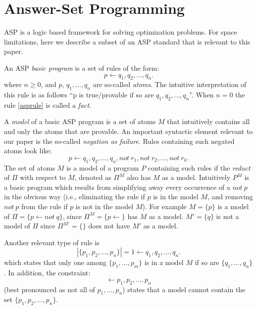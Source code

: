 \section{Answer-Set Programming}
ASP \cite{paper-de-lifschitz-what-is-ASP} is a logic based framework for solving optimization problems. For space limitations, here we describe a subset of an ASP standard that is relevant to this paper. 

An ASP \emph{basic program} is a set of rules of the form:
\begin{equation}\label{asprule}
p\leftarrow q_1,q_2,\ldots,q_n.
\end{equation}
where $n\geq 0$, and $p$, $q_1,\ldots,q_n$ are so-called \emph{atoms}. The intuitive interpretation of this rule is as follows ``p is true/provable if so are $q_1,q_2,\ldots,q_n$''. When $n=0$ the rule \eqref{asprule} is called a \emph{fact}.

A \emph{model} of a basic ASP program is a set of atoms $M$ that intuitively contains all and only the atoms that are provable. An important syntactic element relevant to our paper is the so-called \emph{negation as failure}. Rules containing such negated atoms look like:
\begin{equation}\label{asprule}
p\leftarrow q_1,q_2,\ldots,q_n, not\: r_1,not\: r_2, \ldots, not\: r_k .
\end{equation}
The set of atoms $M$ is a model of a program $P$ containing such rules if the \emph{reduct} of $\Pi$ with respect to $M$, denoted as $\Pi^M$ also has $M$ as a model. Intuitively $P^M$ is a basic program which results from simplifying away every occurrence of a $not\:p$ in the obvious way (i.e., eliminating the rule if $p$ is in the model $M$, and removing $not\:p$ from the rule if $p$ is not in the model $M$). For example $M=\{p\}$ is a model of $\Pi=\{p\leftarrow not\: q\}$, since $\Pi^M=\{p\leftarrow \}$ has $M$ as a model. $M'=\{q\}$ is not a model of $\Pi$ since $\Pi^{M'}=\{\}$ does not have $M'$ as a model.

Another relevant type of rule is
\begin{equation}
    |\{p_1,p_2,\ldots,p_n\}|=1 \leftarrow q_1,q_2,\ldots,q_n.
\end{equation}
which states that only one among $\{p_1,\ldots,p_m\}$ is in a model $M$ if so are $\{q_1,\ldots,q_n\}$. In addition, the constraint:
\begin{equation}
    \leftarrow p_1,p_2,\ldots,p_n 
\end{equation}
(best pronounced as not all of $p_1,\ldots,p_n$) states that a model cannot contain the set $\{p_1,p_2,\ldots,p_n\}$.

